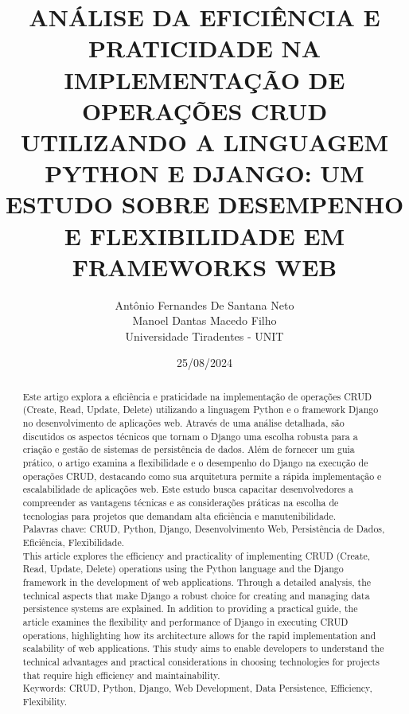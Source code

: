 \documentclass[11pt]{article} %
\title{ANÁLISE DA EFICIÊNCIA E PRATICIDADE NA IMPLEMENTAÇÃO DE OPERAÇÕES CRUD UTILIZANDO A LINGUAGEM PYTHON E DJANGO: UM ESTUDO SOBRE DESEMPENHO E FLEXIBILIDADE EM FRAMEWORKS WEB}
\author{Antônio Fernandes De Santana Neto\\ Manoel Dantas Macedo Filho \\ Universidade Tiradentes - UNIT}
\date{25/08/2024}
\begin{document}
\maketitle
\begin{abstract}
Este artigo explora a eficiência e praticidade na implementação de operações CRUD (Create, Read, Update, Delete) utilizando a linguagem Python e o framework Django no desenvolvimento de aplicações web. Através de uma análise detalhada, são discutidos os aspectos técnicos que tornam o Django uma escolha robusta para a criação e gestão de sistemas de persistência de dados. Além de fornecer um guia prático, o artigo examina a flexibilidade e o desempenho do Django na execução de operações CRUD, destacando como sua arquitetura permite a rápida implementação e escalabilidade de aplicações web. Este estudo busca capacitar desenvolvedores a compreender as vantagens técnicas e as considerações práticas na escolha de tecnologias para projetos que demandam alta eficiência e manutenibilidade.\\
Palavras chave: CRUD, Python, Django, Desenvolvimento Web, Persistência de Dados, Eficiência, Flexibilidade. \\

This article explores the efficiency and practicality of implementing CRUD (Create, Read, Update, Delete) operations using the Python language and the Django framework in the development of web applications. Through a detailed analysis, the technical aspects that make Django a robust choice for creating and managing data persistence systems are explained. In addition to providing a practical guide, the article examines the flexibility and performance of Django in executing CRUD operations, highlighting how its architecture allows for the rapid implementation and scalability of web applications. This study aims to enable developers to understand the technical advantages and practical considerations in choosing technologies for projects that require high efficiency and maintainability.\\ 
Keywords: CRUD, Python, Django, Web Development, Data Persistence, Efficiency, Flexibility.\\
\end{abstract}


\maketitle
\end{document}
